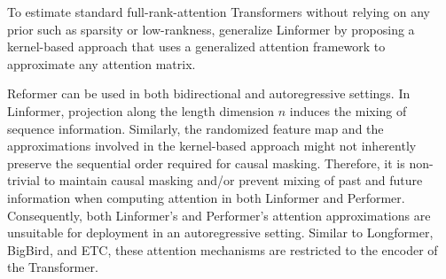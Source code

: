 


To estimate standard full-rank-attention Transformers without relying on any prior such as sparsity or low-rankness, \citet{choromanski2020rethinking} generalize Linformer by proposing a kernel-based approach that uses a generalized attention framework to approximate any attention matrix. 


Reformer can be used in both bidirectional and autoregressive settings. In Linformer, projection along the length dimension $n$ induces the mixing of sequence information. Similarly, the randomized feature map and the approximations involved in the kernel-based approach might not inherently preserve the sequential order required for causal masking. Therefore, it is non-trivial to maintain causal masking and/or prevent mixing of past and future information when computing attention in both Linformer and Performer. Consequently, both Linformer's and Performer's attention approximations are unsuitable for deployment in an autoregressive setting. Similar to Longformer, BigBird, and \ac{ETC}, these attention mechanisms are restricted to the encoder of the Transformer.


